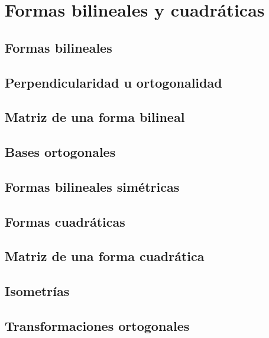 




    
\chapter{Formas bilineales y cuadráticas}

\section{Formas bilineales}
\section{Perpendicularidad u ortogonalidad}
\section{Matriz de una forma bilineal}
\section{Bases ortogonales}
\section{Formas bilineales simétricas}
\section{Formas cuadráticas}
\section{Matriz de una forma cuadrática}
\section{Isometrías}
\section{Transformaciones ortogonales}